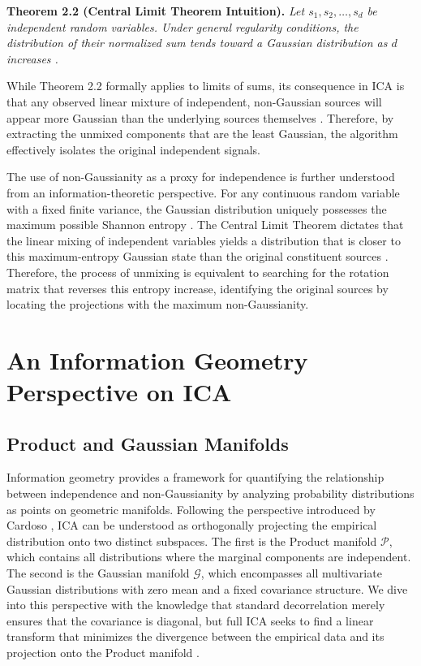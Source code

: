 \documentclass[12pt,a4paper,twoside,openany]{book}
\begin{document}
\vspace{0.5em}
\noindent\textbf{Theorem 2.2 (Central Limit Theorem Intuition).} \textit{Let $s_1, s_2, \dots, s_d$ be independent random variables. 
Under general regularity conditions, the distribution of their normalized sum tends toward a Gaussian distribution as $d$ increases \cite{billingsley1995probability}.}
\vspace{0.5em}

While Theorem 2.2 formally applies to limits of sums, its consequence in ICA is that any observed 
linear mixture of independent, non-Gaussian sources will appear more Gaussian than the underlying sources themselves \cite[Chapter 1]{hyvarinen2001}.
Therefore, by extracting the unmixed components that are the least Gaussian, the algorithm effectively isolates the original independent signals.

The use of non-Gaussianity as a proxy for independence is further understood from an information-theoretic perspective. 
For any continuous random variable with a fixed finite variance, the Gaussian distribution uniquely possesses the maximum 
possible Shannon entropy \cite[Chapter 8]{cover2006elements}. The Central Limit Theorem dictates that the linear mixing of 
independent variables yields a distribution that is closer to this maximum-entropy Gaussian state than the original 
constituent sources \cite[Chapter 8]{hyvarinen2001}. Therefore, the process of unmixing is equivalent to searching for the rotation 
matrix that reverses this entropy increase, identifying the original sources by locating the projections 
with the maximum non-Gaussianity.

\section{An Information Geometry Perspective on ICA}

\subsection{Product and Gaussian Manifolds}
Information geometry provides a framework for quantifying the relationship between independence and non-Gaussianity 
by analyzing probability distributions as points on geometric manifolds. 
Following the perspective introduced by Cardoso \citeyear{cardoso2022}, ICA can be understood as orthogonally projecting 
the empirical distribution onto two distinct subspaces. The first is the Product manifold $\mathcal{P}$, 
which contains all distributions where the marginal components are independent. The second is the 
Gaussian manifold $\mathcal{G}$, which encompasses all multivariate Gaussian distributions with zero mean and a fixed covariance structure. 
We dive into this perspective with the knowledge that standard decorrelation merely ensures that the covariance is diagonal, but full ICA seeks to find a linear transform 
that minimizes the divergence between the empirical data and its projection onto the Product manifold \cite{cardoso2022}.
\end{document}
